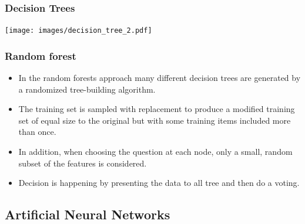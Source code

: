 \documentclass[aspectratio=169]{beamer}
\begin{document}
\begin{frame}
  \frametitle{Decision Trees}
  \begin{center}
    \texttt{[image: images/decision\_tree\_2.pdf]}
  \end{center}  
\end{frame}


\begin{frame}
  \frametitle{Random forest}
  \begin{block}{}
    \begin{center}
      \begin{itemize}
      \item In the random forests approach many different decision
        trees are generated by a randomized tree-building algorithm.
      \item The training set is sampled with replacement to produce a
        modified training set of equal size to the original but with some
        training items included more than once.
      \item In addition, when choosing the question at each node, only a
        small, random subset of the features is considered.
      \item Decision is happening by presenting the data to all tree
        and then do a voting.
      \end{itemize}
    \end{center}
  \end{block}
\end{frame}

\subsection{Artificial Neural Networks}
\end{document}
